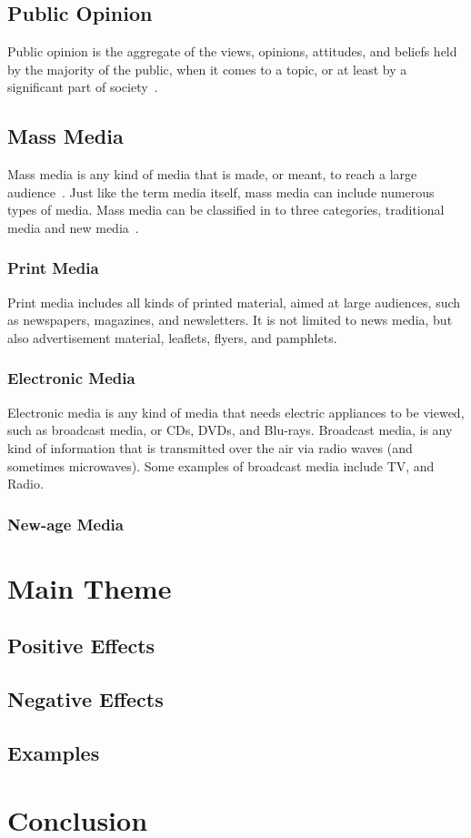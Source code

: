 \documentclass[a4paper,12pt]{article}
\begin{document}
\subsection{Public Opinion}
Public opinion is the aggregate of the views, opinions, attitudes, and beliefs held by the majority of the public,
when it comes to a topic, or at least by a significant part of society~\parencite{davison2024public}.
\subsection{Mass Media}
Mass media is any kind of media that is made, or meant, to reach a large audience~\parencite{duignan2024mass}.
Just like the term media itself, mass media can include numerous types of media.
Mass media can be classified in to three categories, traditional media and new media~\parencite{manohar2008different}.
\subsubsection{Print Media}
Print media includes all kinds of printed material, aimed at large audiences, such as newspapers, magazines, and newsletters.
It is not limited to news media, but also advertisement material, leaflets, flyers, and pamphlets.
\subsubsection{Electronic Media}
Electronic media is any kind of media that needs electric appliances to be viewed, such as broadcast media, or CDs, DVDs, and Blu-rays.
Broadcast media, is any kind of information that is transmitted over the air via radio waves (and sometimes microwaves).
Some examples of broadcast media include TV, and Radio.

\subsubsection{New-age Media}

\section{Main Theme}
\subsection{Positive Effects}
\subsection{Negative Effects}
\subsection{Examples}

\section{Conclusion}

\newpage
\printbibliography
\end{document}
